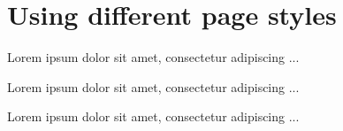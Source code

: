 \documentclass[a4paper,12pt,twoside]{book}
\begin{document}
\chapter{Using different page styles}

Lorem ipsum dolor sit amet, consectetur adipiscing ...

\newpage

Lorem ipsum dolor sit amet, consectetur adipiscing ...

\newpage

Lorem ipsum dolor sit amet, consectetur adipiscing ...
\end{document}
